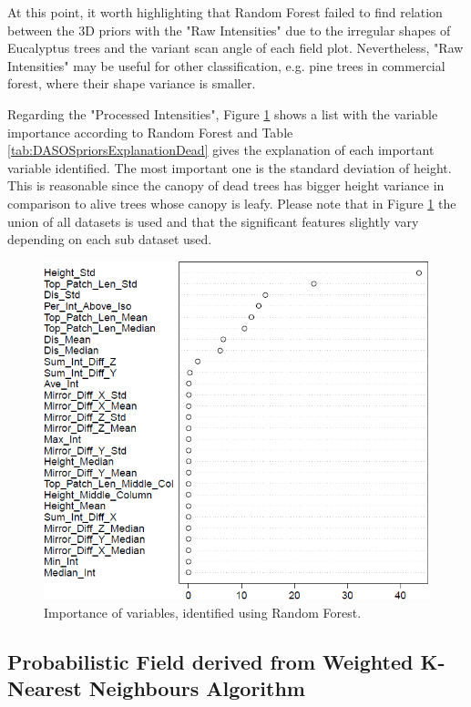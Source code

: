 \documentclass{subfiles}
\begin{document}
	
	\par At this point, it worth highlighting that Random Forest failed to find relation between the 3D priors with the "Raw Intensities" due to the irregular shapes of Eucalyptus trees and the variant scan angle of each field plot. Nevertheless, "Raw Intensities" may be useful for other classification, e.g. pine trees in commercial forest, where their shape variance is smaller.
	
	\par Regarding the "Processed Intensities", Figure \ref{fig:c0_RandomForest} shows a list with the variable importance according to Random Forest and Table \ref{tab:DASOSpriorsExplanationDead} gives the explanation of each important variable identified. The most important one is the standard deviation of height. This is reasonable since the canopy of dead trees has bigger height variance in comparison to alive trees whose canopy is leafy. Please note that in Figure \ref{fig:c0_RandomForest} the union of all datasets is used and that the significant features slightly vary depending on each sub dataset used.  
	
		\begin{figure} [h!]			
				\centering
				\includegraphics[width=.67\textwidth]{img/dead/c0_random_forest}
				\caption{Importance of variables, identified using Random Forest.}
				\label{fig:c0_RandomForest}
		\end{figure}
		

	
	
	
\subsection{Probabilistic Field derived from Weighted K-Nearest Neighbours Algorithm }
\end{document}
